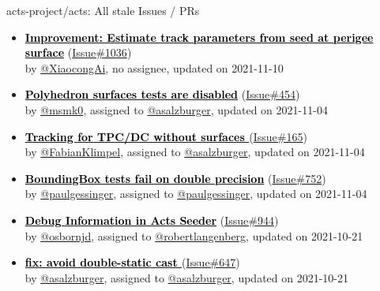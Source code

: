 \begin{frame}[allowframebreaks]{ acts-project/acts: All stale Issues / PRs}
\begin{itemize}
    \item
    \textbf{\href{https://github.com/acts-project/acts/issues/1036}{\textcolor{black}{Improvement: Estimate track parameters from seed at perigee surface}}}
    (\href{https://github.com/acts-project/acts/issues/1036}{Issue\#1036}) \\
    by \href{https://github.com/XiaocongAi}{@XiaocongAi}, {}no assignee, updated on 2021-11-10

    \item
    \textbf{\href{https://github.com/acts-project/acts/issues/454}{\textcolor{black}{Polyhedron surfaces tests are disabled}}}
    (\href{https://github.com/acts-project/acts/issues/454}{Issue\#454}) \\
    by \href{https://github.com/msmk0}{@msmk0}, {}assigned to \href{https://github.com/asalzburger}{@asalzburger}, updated on 2021-11-04

    \item
    \textbf{\href{https://github.com/acts-project/acts/issues/165}{\textcolor{black}{Tracking for TPC/DC without surfaces }}}
    (\href{https://github.com/acts-project/acts/issues/165}{Issue\#165}) \\
    by \href{https://github.com/FabianKlimpel}{@FabianKlimpel}, {}assigned to \href{https://github.com/asalzburger}{@asalzburger}, updated on 2021-11-04

    \item
    \textbf{\href{https://github.com/acts-project/acts/issues/752}{\textcolor{black}{BoundingBox tests fail on double precision}}}
    (\href{https://github.com/acts-project/acts/issues/752}{Issue\#752}) \\
    by \href{https://github.com/paulgessinger}{@paulgessinger}, {}assigned to \href{https://github.com/paulgessinger}{@paulgessinger}, updated on 2021-11-04

    \item
    \textbf{\href{https://github.com/acts-project/acts/issues/944}{\textcolor{black}{Debug Information in Acts Seeder}}}
    (\href{https://github.com/acts-project/acts/issues/944}{Issue\#944}) \\
    by \href{https://github.com/osbornjd}{@osbornjd}, {}assigned to \href{https://github.com/robertlangenberg}{@robertlangenberg}, updated on 2021-10-21

    \item
    \textbf{\href{https://github.com/acts-project/acts/issues/647}{\textcolor{black}{fix: avoid double-static cast }}}
    (\href{https://github.com/acts-project/acts/issues/647}{Issue\#647}) \\
    by \href{https://github.com/asalzburger}{@asalzburger}, {}assigned to \href{https://github.com/asalzburger}{@asalzburger}, updated on 2021-10-21

  \end{itemize}
\end{frame}
